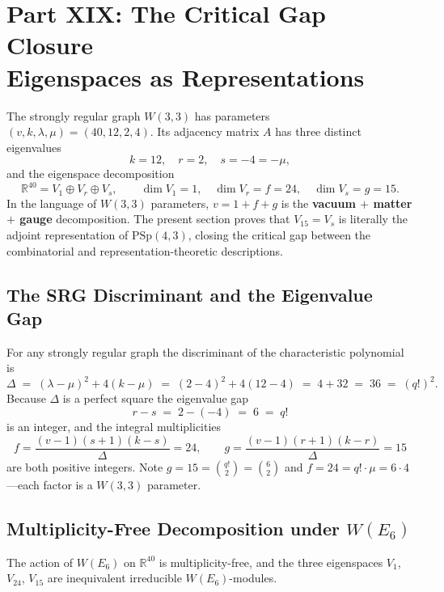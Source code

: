 \section[Part XIX: The Critical Gap Closure]{Part XIX: The Critical Gap Closure\\Eigenspaces as Representations}

The strongly regular graph $W(3,3)$ has parameters $(v, k, \lambda, \mu) = (40, 12, 2, 4)$.
Its adjacency matrix $A$ has three distinct eigenvalues
\[
  k = 12, \quad r = 2, \quad s = -4 = -\mu,
\]
and the eigenspace decomposition
\[
  \mathbb{R}^{40} = V_1 \oplus V_{r} \oplus V_{s}, \qquad
  \dim V_1 = 1,\quad \dim V_r = f = 24,\quad \dim V_s = g = 15.
\]
In the language of $W(3,3)$ parameters, $v = 1 + f + g$ is the
\textbf{vacuum $+$ matter $+$ gauge} decomposition.  The present section proves that
$V_{15} = V_s$ is literally the adjoint representation of $\mathrm{PSp}(4,3)$,
closing the critical gap between the combinatorial and representation-theoretic
descriptions.

\subsection{The SRG Discriminant and the Eigenvalue Gap}

For any strongly regular graph the discriminant of the characteristic polynomial is
\[
  \Delta \;=\; (\lambda - \mu)^2 + 4(k - \mu)
           \;=\; (2-4)^2 + 4(12-4) \;=\; 4 + 32 \;=\; 36 \;=\; (q!)^2.
\]
Because $\Delta$ is a perfect square the eigenvalue gap
\[
  r - s \;=\; 2 - (-4) \;=\; 6 \;=\; q!
\]
is an integer, and the integral multiplicities
\[
  f = \frac{(v-1)(s+1)(k-s)}{\Delta} = 24, \qquad
  g = \frac{(v-1)(r+1)(k-r)}{\Delta} = 15
\]
are both positive integers.  Note $g = 15 = \binom{q!}{2} = \binom{6}{2}$ and
$f = 24 = q! \cdot \mu = 6 \cdot 4$---each factor is a $W(3,3)$ parameter.

\subsection{Multiplicity-Free Decomposition under $W(E_6)$}

\begin{theorem}
The action of $W(E_6)$ on $\mathbb{R}^{40}$ is multiplicity-free, and the
three eigenspaces $V_1$, $V_{24}$, $V_{15}$ are inequivalent irreducible
$W(E_6)$-modules.
\end{theorem}

